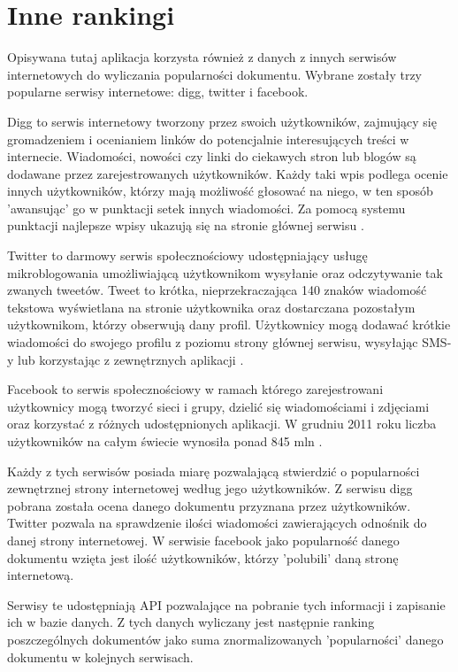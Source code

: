 \section{Inne rankingi}

Opisywana tutaj aplikacja korzysta również z danych z innych serwisów internetowych do wyliczania popularności dokumentu. Wybrane zostały trzy popularne serwisy internetowe: digg, twitter i facebook.

Digg to serwis internetowy tworzony przez swoich użytkowników, zajmujący się gromadzeniem i ocenianiem linków do potencjalnie interesujących treści w internecie. Wiadomości, nowości czy linki do ciekawych stron lub blogów są dodawane przez zarejestrowanych użytkowników. Każdy taki wpis podlega ocenie innych użytkowników, którzy mają możliwość głosować na niego, w ten sposób 'awansując' go w punktacji setek innych wiadomości. Za pomocą systemu punktacji najlepsze wpisy ukazują się na stronie głównej serwisu \cite{wikipedia:digg}. 

Twitter to darmowy serwis społecznościowy udostępniający usługę mikroblogowania umożliwiającą użytkownikom wysyłanie oraz odczytywanie tak zwanych tweetów. Tweet to krótka, nieprzekraczająca 140 znaków wiadomość tekstowa wyświetlana na stronie użytkownika oraz dostarczana pozostałym użytkownikom, którzy obserwują dany profil. Użytkownicy mogą dodawać krótkie wiadomości do swojego profilu z poziomu strony głównej serwisu, wysyłając SMS-y lub korzystając z zewnętrznych aplikacji \cite{wikipedia:twitter}. 

Facebook to serwis społecznościowy w ramach którego zarejestrowani użytkownicy mogą tworzyć sieci i grupy, dzielić się wiadomościami i zdjęciami oraz korzystać z różnych udostępnionych aplikacji. W grudniu 2011 roku liczba użytkowników na całym świecie wynosiła ponad 845 mln \cite{wikipedia:facebook}.


Każdy z tych serwisów posiada miarę pozwalającą stwierdzić o popularności zewnętrznej strony internetowej według jego użytkowników. Z serwisu digg pobrana została ocena danego dokumentu przyznana przez użytkowników. Twitter pozwala na sprawdzenie ilości wiadomości zawierających odnośnik do danej strony internetowej. W serwisie facebook jako popularność danego dokumentu wzięta jest ilość użytkowników, którzy 'polubili' daną stronę internetową. 

Serwisy te udostępniają API pozwalające na pobranie tych informacji i zapisanie ich w bazie danych. Z tych danych wyliczany jest następnie ranking poszczególnych dokumentów jako suma znormalizowanych 'popularności' danego dokumentu w kolejnych serwisach. 

